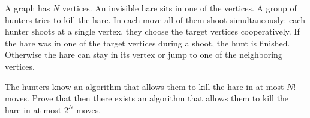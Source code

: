 A graph has $N$ vertices. An invisible hare sits in one of the vertices. A group of hunters tries to kill the hare. In each move all of them shoot simultaneously: each hunter shoots at a single vertex, they choose the target vertices cooperatively. If the hare was in one of the target vertices during a shoot, the hunt is finished. Otherwise the hare can stay in its vertex or jump to one of the neighboring vertices.

The hunters know an algorithm that allows them to kill the hare in at most $N!$ moves. Prove that then there exists an algorithm that allows them to kill the hare in at most $2^N$ moves.